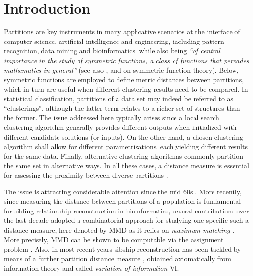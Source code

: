\documentclass[a4paper,10pt]{article}
\begin{document}
\section{Introduction}
Partitions are key instruments in many applicative scenarios at the interface of computer science, artificial intelligence and engineering, including pattern recognition,
data mining and bioinformatics, while also being \textit{``of central importance in the study of symmetric functions, a class of functions that pervades mathematics in
general''} \cite[p. 39]{Knuth2005} (see also \cite[Chapter 5]{RotaWay2009}, \cite{RosasSagan2006} and \cite[Chapter 7]{Stanley2012EnuCom} on symmetric function theory).
Below, symmetric functions are employed to define metric distances between partitions, which in turn are useful when different clustering results need to be compared. In
statistical classification, partitions of a data set may indeed be referred to as ``clusterings'', although the latter term relates to a richer set of structures than the
former. The issue addressed here typically arises since a local search clustering algorithm generally provides different outputs when initialized with different candidate
solutions (or inputs). On the other hand, a chosen clustering algorithm shall allow for different parametrizations, each yielding different results for the same data.
Finally, alternative clustering algorithms commonly partition the same set in alternative ways. In all these cases, a distance measure is essential for assessing the
proximity between diverse partitions \cite{Meila2007,Mirkin2013,CentralPartition}.

The issue is attracting considerable attention since the mid 60s \cite{Lerman1981,Rand1971,Renier1965}. More recently, since measuring the distance between partitions of a
population is fundamental for sibling relationship reconstruction in bioinformatics, several contributions over the last decade adopted a combinatorial approach for studying
one specific such a distance measure, here denoted by MMD as it relies on \textit{maximum matching}
\cite{Berger-Wolf+al2007,Konovalov2006,Konovalov+al2005B,Konovalov+al2005A,Sheikh+al2010}. More precisely, MMD can be shown \cite{Almudevar+1999,Day1981,Gusfield2002} to be
computable via the assignment problem \cite{KorteVygen2002}. Also, in most recent years sibship reconstruction has been tackled by means of a further partition distance
measure \cite{Brown+2012}, obtained axiomatically from information theory \cite{Meila2007} and called \textsl{variation of information} VI.
\end{document}
